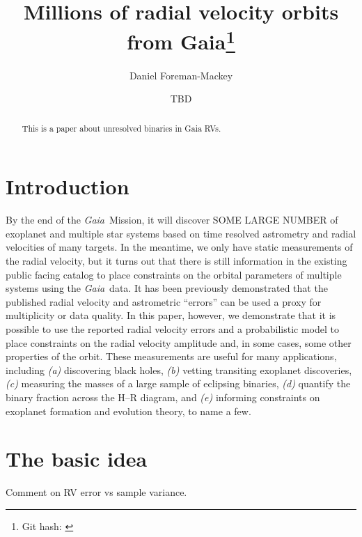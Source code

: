 \documentclass[modern, letterpaper]{aastex63}
\newcommand{\project}[1]{\textsl{#1}}
\newcommand{\Gaia}{\project{Gaia}}
\begin{document}
\title{Millions of radial velocity orbits from Gaia\footnote{Git hash: \textsf{\githash}}}


\author[0000-0002-9328-5652]{Daniel Foreman-Mackey}

\author{TBD}
\noaffiliation{}

\begin{abstract}
  This is a paper about unresolved binaries in Gaia RVs.
\end{abstract}


\section{Introduction} \label{sec:intro}

By the end of the \Gaia\ Mission, it will discover SOME LARGE NUMBER of exoplanet and multiple star systems based on time resolved astrometry and radial velocities of many targets.
In the meantime, we only have static measurements of the radial velocity, but it turns out that there is still information in the existing public facing catalog to place constraints on the orbital parameters of multiple systems using the \Gaia\ data.
It has been previously demonstrated that the published radial velocity and astrometric ``errors'' can be used a proxy for multiplicity or data quality.
In this paper, however, we demonstrate that it is possible to use the reported radial velocity errors and a probabilistic model to place constraints on the radial velocity amplitude and, in some cases, some other properties of the orbit.
These measurements are useful for many applications, including \emph{(a)} discovering black holes, \emph{(b)} vetting transiting exoplanet discoveries, \emph{(c)} measuring the masses of a large sample of eclipsing binaries, \emph{(d)} quantify the binary fraction across the H--R diagram, and \emph{(e)} informing constraints on exoplanet formation and evolution theory, to name a few.

\section{The basic idea}

Comment on RV error vs sample variance.
\end{document}

